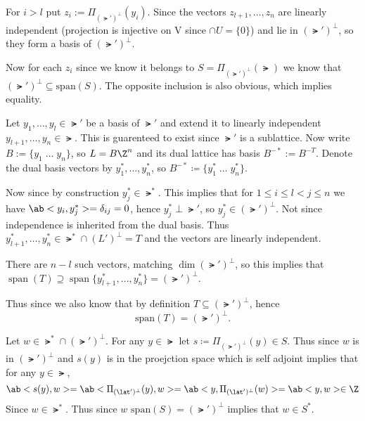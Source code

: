 \documentclass[12pt]{amsart}
\begin{document}
\begin{problem}
\begin{subproblem}
      For $i>l$ put $z_i:=\Pi_{(\lat')^\perp}(y_i)$. Since the vectors $z_{l+1},\dots ,z_n$ are linearly independent (projection is injective on V since $\cap U=\{0\}$) and lie in $(\lat')^\perp$, so they form a basis of $(\lat')^\perp$.

      Now for each $z_i$ since we know it belongs to $S=\Pi_{(\lat')^\perp}(\lat)$ we know that $(\lat')^\perp\subseteq\mathrm{span}(S)$.
      The opposite inclusion is also obvious, which implies equality.
    \end{subproblem}


    \begin{subproblem}
    Let $y_{1},\dots ,y_{l}\in \lat'$ be a basis of $\lat'$ and extend it to linearly independent $y_{l+1},\dots ,y_{n}\in \lat$. This is guarenteed to exist since $\lat'$ is a sublattice. Now write $B:=\{y_{1}\;\dots\;y_{n}\}$, so $L=B\Z^{n}$ and its dual lattice has basis $B^{-*}:=B^{-T}$. Denote the dual basis vectors by $y_{1}^{*},\dots ,y_{n}^{*}$, so $B^{-*}\coloneq\{y_{1}^{*}\;\dots\;y_{n}^{*}\}$.
    
    Now since by construction $y_{j}^{*}\in \lat^{*}$. This implies that for $1\le i\le l<j\le n$ we have $\ab<y_{i},y_{j}^{*}>=\delta_{ij}=0$, hence $y_{j}^{*}\perp \lat'$, so $y_{j}^{*}\in(\lat')^{\perp}$. Not since independence is inherited from the dual basis. Thus $y_{l+1}^{*},\dots ,y_{n}^{*}\in \lat^{*}\cap(L')^{\perp}=T$ and the vectors are linearly independent.
    
    There are $n-l$ such vectors, matching
    $\dim(\lat')^{\perp}$, so this implies that $\operatorname{span}(T)\supseteq\operatorname{span}\{y_{l+1}^{*},\dots ,y_{n}^{*}\}=(\lat')^{\perp}$.
    
    Thus since we also know that by definition $T\subseteq(\lat')^{\perp}$, hence
    \[ \mathrm{span}(T)=(\lat')^{\perp}. \]
    \end{subproblem}
    

    \begin{subproblem}
      Let $w\in\lat^*\cap (\lat')^\perp$. For any $y\in \lat$ let $s\coloneq\Pi_{(\lat')^\perp}(y)\in S$. Thus since $w$ is in $(\lat')^\perp$ and $s(y)$ is in the proejction space which is self adjoint implies that for any $y\in\lat$, 
      \[\ab<s(y),w>=\ab<\Pi_{(\lat')^\perp}(y),w> = \ab<y, \Pi_{(\lat')^\perp}(w)>=\ab<y,w>\in \Z\]
      Since $w\in \lat^*$. Thus since $w$ $\mathrm{span}(S)=(\lat')^\perp$ implies that $w\in S^*$.


\end{subproblem}
\end{problem}
\end{document}
